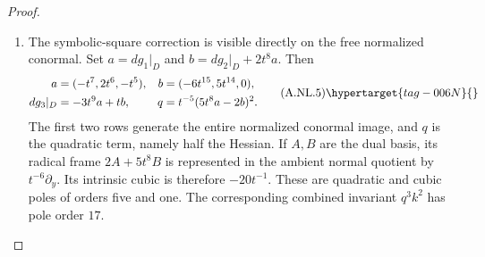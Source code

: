 \begin{proof}
\begin{enumerate}[label={$\langle1\rangle$\arabic*.},leftmargin=*]
\item The symbolic-square correction is visible directly on the free
normalized conormal. Set $a=dg_1|_D$ and
$b=dg_2|_D+2t^8a$. Then
\[
 \begin{aligned}
 a&=(-t^7,2t^6,-t^5),& b&=(-6t^{15},5t^{14},0),\\
 dg_3|_D&=-3t^9a+tb,&
 q&=t^{-5}(5t^8a-2b)^2.
 \end{aligned}                                                   \tag{A.NL.5}\hypertarget{tag-006N}{}\label{cdp:eq:A.NL.5}
\]
The first two rows generate the entire normalized conormal image,
and $q$ is the quadratic term, namely half the Hessian.
If $A,B$ are the dual basis, its radical frame $2A+5t^8B$
is represented in the ambient normal quotient by $t^{-6}\partial_y$.
Its intrinsic cubic is therefore $-20t^{-1}$. These are
quadratic and cubic poles of orders five and one. The corresponding
combined invariant $q^3k^2$ has pole order $17$.


\end{enumerate}
\end{proof}